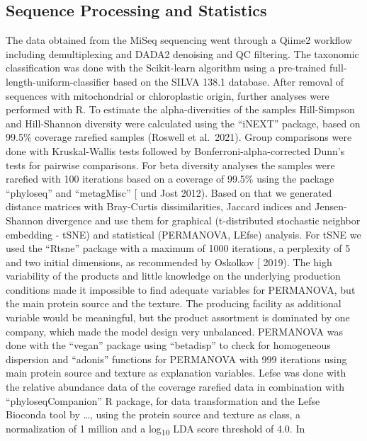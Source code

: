 \documentclass[preprint, 3p,
authoryear]{elsarticle} %
\begin{document}
\hypertarget{sequence-processing-and-statistics}{%
\subsection{Sequence Processing and
Statistics}\label{sequence-processing-and-statistics}}

The data obtained from the MiSeq sequencing went through a Qiime2
workflow including demultiplexing and DADA2 denoising and QC filtering.
The taxonomic classification was done with the Scikit-learn algorithm
using a pre-trained full-length-uniform-classifier based on the SILVA
138.1 database. After removal of sequences with mitochondrial or
chloroplastic origin, further analyses were performed with R. To
estimate the alpha-diversities of the samples Hill-Simpson and
Hill-Shannon diversity were calculated using the ``iNEXT'' package,
based on 99.5\% coverage rarefied samples (Roswell et al.~2021). Group
comparisons were done with Kruskal-Wallis tests followed by
Bonferroni-alpha-corrected Dunn's tests for pairwise comparisons. For
beta diversity analyses the samples were rarefied with 100 iterations
based on a coverage of 99.5\% using the package ``phyloseq'' and
``metagMisc'' {[}\citet{Chao} und Jost 2012). Based on that we generated
distance matrices with Bray-Curtis dissimilarities, Jaccard indices and
Jensen-Shannon divergence and use them for graphical (t-distributed
stochastic neighbor embedding - tSNE) and statistical (PERMANOVA, LEfse)
analysis. For tSNE we used the ``Rtsne'' package with a maximum of 1000
iterations, a perplexity of 5 and two initial dimensions, as recommended
by Oskolkov {[}\citet{Oskolkov} 2019). The high variability of the
products and little knowledge on the underlying production conditions
made it impossible to find adequate variables for PERMANOVA, but the
main protein source and the texture. The producing facility as
additional variable would be meaningful, but the product assortment is
dominated by one company, which made the model design very unbalanced.
PERMANOVA was done with the ``vegan'' package using ``betadisp'' to
check for homogeneous dispersion and ``adonis'' functions for PERMANOVA
with 999 iterations using main protein source and texture as explanation
variables. Lefse was done with the relative abundance data of the
coverage rarefied data in combination with ``phyloseqCompanion'' R
package, for data transformation and the Lefse Bioconda tool by \ldots,
using the protein source and texture as class, a normalization of 1
million and a log\textsubscript{10} LDA score threshold of 4.0. In
\end{document}
